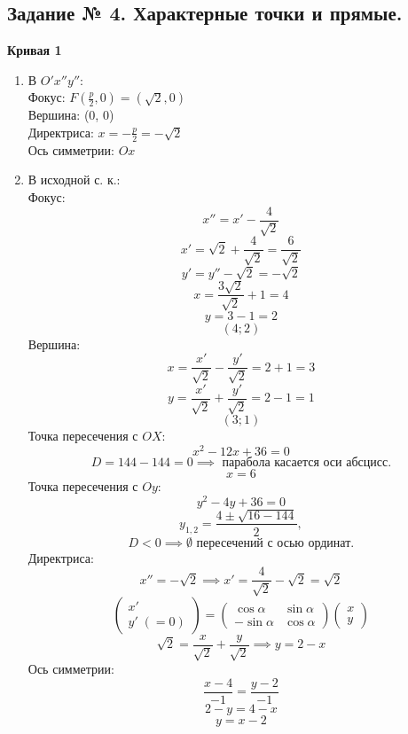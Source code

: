 \documentclass{article}
\theoremstyle{plain}
\begin{document}
\begin{enumerate}
    \section{Задание № 4. Характерные точки и прямые.}
    \textbf{Кривая 1}
    \begin{enumerate}
    \item В $O'x''y''$:\\
    \vspace{2mm}
    Фокус: $F(\frac{p}{2}, 0) = (\sqrt{2}, 0)$\\
    \vspace{2mm}
    Вершина: (0, 0)\\
    \vspace{2mm}
    Директриса: $x = -\frac{p}{2} = -\sqrt{2}$\\
    \vspace{2mm}
    Ось симметрии: $Ox$
    \item В исходной с. к.:\\
    Фокус: 
    $$x'' = x' - \frac{4}{\sqrt{2}}$$
    $$x' = \sqrt{2} + \frac{4}{\sqrt{2}} = \frac{6}{\sqrt{2}}$$
    $$y' = y'' - \sqrt{2} = -\sqrt{2}$$
    $$x = \frac{3\sqrt{2}}{\sqrt{2}} + 1 = 4$$
    $$y = 3 - 1 = 2$$
    $$(4; 2)$$
    Вершина:
    $$x = \frac{x'}{\sqrt{2}} - \frac{y'}{\sqrt{2}} = 2 + 1 = 3$$
    $$y = \frac{x'}{\sqrt{2}} + \frac{y'}{\sqrt{2}} = 2 - 1 = 1 $$
    $$(3; 1)$$
    Точка пересечения с $OX$:
    $$x^2 - 12x + 36 = 0$$
    $$D = 144 - 144 = 0\implies \text{ парабола касается оси абсцисс.}$$
    $$x = 6$$
    Точка пересечения с $Oy$:
    $$y^2 - 4y + 36 = 0$$
    $$y_{1,2} = \frac{4 \pm \sqrt{16 - 144}}{2}, $$
    $$ D < 0 \implies \emptyset  \text{ пересечений с осью ординат.}$$
    Директриса: 
    $$x'' = -\sqrt{2}\implies x' = \frac{4}{\sqrt{2}} - \sqrt{2} = \sqrt{2}$$
    $$\begin{pmatrix}
        x'\,\\
        y'\;(= 0)
    \end{pmatrix} =  \begin{pmatrix}
        \cos{\alpha} & \sin{\alpha} \\
        -\sin{\alpha} & \cos{\alpha}
    \end{pmatrix}\begin{pmatrix}
        x \\ 
        y
    \end{pmatrix}$$
    $$\sqrt{2} = \frac{x}{\sqrt{2}} + \frac{y}{\sqrt{2}} \implies y = 2 - x$$
    Ось симметрии:
    $$\frac{x - 4}{-1} = \frac{y - 2}{-1}$$
    $$2 - y = 4 - x$$
    $$y = x - 2$$

\end{enumerate}
\end{enumerate}
\end{document}

